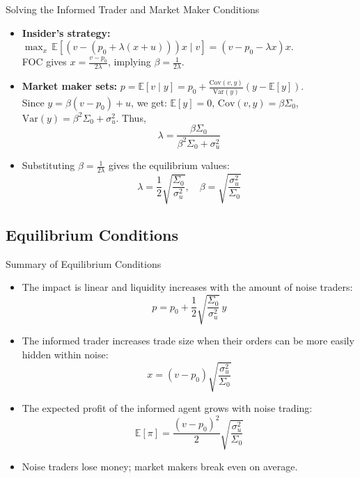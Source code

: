 \documentclass{beamer}
\begin{document}
\begin{frame}
\tiny\begin{block}{Solving the Informed Trader and Market Maker Conditions}
\tiny
\begin{itemize}
    \item \textbf{Insider's strategy:}
    \(
    \max_x \, \mathbb{E}[(v - (p_0 + \lambda(x + u)))x \mid v] = (v - p_0 - \lambda x)x
    \). 
    \\FOC gives 
    \( x = \frac{v - p_0}{2\lambda} \), implying \( \beta = \frac{1}{2\lambda} \).

    \item \textbf{Market maker sets:} 
    \( p = \mathbb{E}[v \mid y] = p_0 + \frac{\text{Cov}(v, y)}{\text{Var}(y)}(y - \mathbb{E}[y]) \). \\
    Since 
    \( y = \beta(v - p_0) + u \), we get: 
    \( \mathbb{E}[y] = 0 \), 
    \( \text{Cov}(v, y) = \beta \Sigma_0 \), 
    \( \text{Var}(y) = \beta^2 \Sigma_0 + \sigma_u^2 \). Thus,
    \[
    \lambda = \frac{\beta \Sigma_0}{\beta^2 \Sigma_0 + \sigma_u^2}
    \]

    \item Substituting \( \beta = \frac{1}{2\lambda} \) gives the equilibrium values:
\[
\boxed{
  \lambda = \frac{1}{2} \sqrt{\frac{\Sigma_0}{\sigma_u^2}}, \quad
  \beta = \sqrt{\frac{\sigma_u^2}{\Sigma_0}}
}
\]
\end{itemize}

\end{block}

\end{frame}

\subsection{Equilibrium Conditions}
\begin{frame}

{\tiny
\begin{block}{Summary of Equilibrium Conditions}
\tiny
\begin{itemize}
    \item The impact is linear and liquidity increases with the amount of noise traders:
    \[
    p = p_0 + \frac{1}{2} \sqrt{\frac{\Sigma_0}{\sigma_u^2}} \, y
    \]

    \item The informed trader increases trade size when their orders can be more easily hidden within noise:
    \[
    x = (v - p_0) \sqrt{\frac{\sigma_u^2}{\Sigma_0}}
    \]

    \item The expected profit of the informed agent grows with noise trading:
    \[
    \mathbb{E}[\pi] = \frac{(v - p_0)^2}{2} \sqrt{\frac{\sigma_u^2}{\Sigma_0}}
    \]

    \item Noise traders lose money; market makers break even on average.
\end{itemize}
\end{block}
}

\end{frame}
\end{document}
